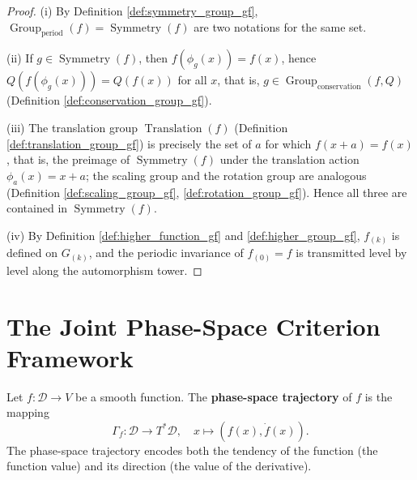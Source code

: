 \begin{proof}
(i) By Definition \ref{def:symmetry_group_gf}, $\operatorname{Group}_{\mathrm{period}}(f)=\operatorname{Symmetry}(f)$ are two notations for the same set.

(ii) If $g\in\operatorname{Symmetry}(f)$, then $f(\phi_g(x))=f(x)$, hence $Q(f(\phi_g(x)))=Q(f(x))$ for all $x$, that is, $g\in\operatorname{Group}_{\mathrm{conservation}}(f,Q)$ (Definition \ref{def:conservation_group_gf}).

(iii) The translation group $\operatorname{Translation}(f)$ (Definition \ref{def:translation_group_gf}) is precisely the set of $a$ for which $f(x+a)=f(x)$, that is, the preimage of $\operatorname{Symmetry}(f)$ under the translation action $\phi_a(x)=x+a$; the scaling group and the rotation group are analogous (Definition \ref{def:scaling_group_gf}, \ref{def:rotation_group_gf}). Hence all three are contained in $\operatorname{Symmetry}(f)$.

(iv) By Definition \ref{def:higher_function_gf} and \ref{def:higher_group_gf}, $f_{(k)}$ is defined on $G_{(k)}$, and the periodic invariance of $f_{(0)}=f$ is transmitted level by level along the automorphism tower.
\end{proof}

\section{\texorpdfstring{The Joint Phase-Space Criterion Framework}{The Joint Phase-Space Criterion Framework}}

\begin{definition}\label{def:function_phase_trajectory}
Let $f: \mathcal{D} \to V$ be a smooth function. The \textbf{phase-space trajectory} of $f$ is the mapping
\[
\Gamma_f: \mathcal{D} \to T^*\mathcal{D}, \quad x \mapsto (f(x), \dot{f}(x)).
\]
The phase-space trajectory encodes both the tendency of the function (the function value) and its direction (the value of the derivative).
\end{definition}

